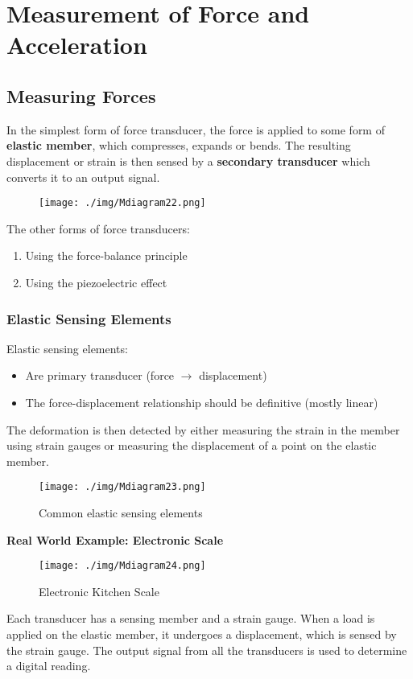\chapter{Measurement of Force and Acceleration}
\section{Measuring Forces}
In the simplest form of force transducer, the force is applied to some form of \textbf{elastic member}, which compresses, expands or bends. The resulting displacement or strain is then sensed by a \textbf{secondary transducer} which converts it to an output signal.
\begin{figure}[H]
  \centering
  \texttt{[image: ./img/Mdiagram22.png]}
\end{figure}
The other forms of force transducers:
\begin{enumerate}
  \item Using the force-balance principle
  \item Using the piezoelectric effect
\end{enumerate}
\subsection{Elastic Sensing Elements}
Elastic sensing elements:
\begin{itemize}
  \item Are primary transducer (force $\rightarrow$ displacement)
  \item The force-displacement relationship should be definitive (mostly linear)
\end{itemize}
The deformation is then detected by either measuring the strain in the member using strain gauges or measuring the displacement of a point on the elastic member.
\begin{figure}[H]
  \centering
  \texttt{[image: ./img/Mdiagram23.png]}
  \caption{Common elastic sensing elements}
\end{figure}
\textbf{Real World Example: Electronic Scale}
\begin{figure}[H]
  \centering
  \texttt{[image: ./img/Mdiagram24.png]}
  \caption{Electronic Kitchen Scale}
\end{figure}
Each transducer has a sensing member and a strain gauge. When a load is applied on the elastic member, it undergoes a displacement, which is sensed by the strain gauge. The output signal from all the transducers is used to determine a digital reading.
